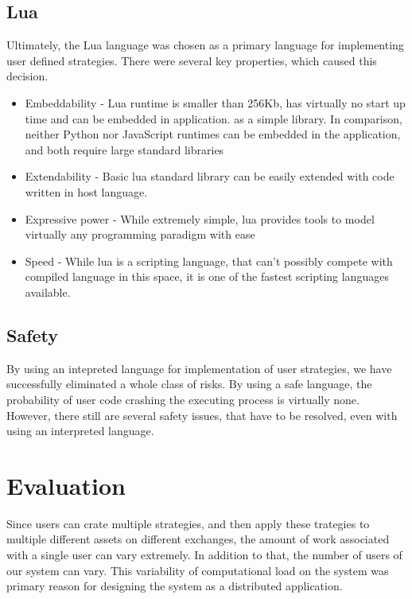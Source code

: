 \subsection{Lua}
Ultimately, the Lua language was chosen as a primary language for implementing user defined strategies. There were several
key properties, which caused this decision.

\begin{itemize}
\item Embeddability - Lua runtime is smaller than 256Kb, has virtually no start up time and can be embedded in application.
as a simple library. In comparison, neither Python nor JavaScript runtimes can be embedded in the application, and both
require large standard libraries
\item Extendability - Basic lua standard library can be easily extended with code written in host language.
\item Expressive power - While extremely simple, lua provides tools to model virtually any programming paradigm with ease
\item Speed - While lua is a scripting language, that can't possibly compete with compiled language in this space,
it is one of the fastest scripting languages available.
\end{itemize}

\subsection{Safety}
By using an intepreted language for implementation of user strategies, we have successfully eliminated a whole
class of risks. By using a safe language, the probability of user code crashing the executing process is virtually
none. However, there still are several safety issues, that have to be resolved, even with using an interpreted language.

\section{Evaluation}
Since users can crate multiple strategies, and then apply these trategies to multiple different assets on different exchanges,
the amount of work associated with a single user can vary extremely. In addition to that, the number of users of our system can vary.
This variability of computational load on the system was primary reason for designing the system as a distributed application.


